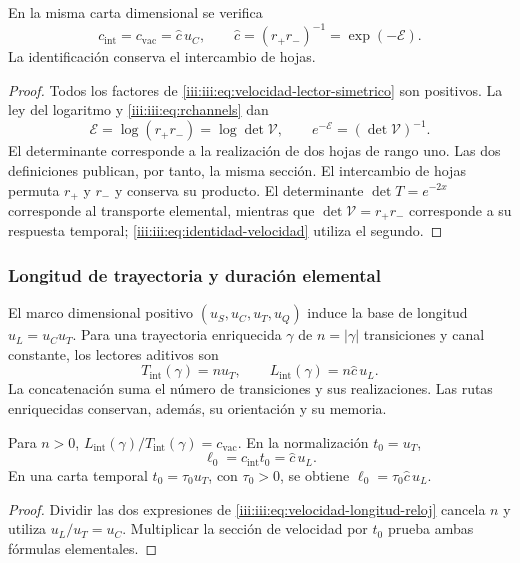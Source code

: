 \begin{proposition}
\label{iii:iii:prop:identidad-velocidad}
En la misma carta dimensional se verifica
\begin{equation}
 c_{\mathrm{int}}=c_{\mathrm{vac}}=\widehat c\,u_C,
 \qquad \widehat c=(r_+r_-)^{-1}=\exp(-\mathcal E).
 \label{iii:iii:eq:identidad-velocidad}
\end{equation}
La identificación conserva el intercambio de hojas.
\end{proposition}
\begin{proof}
Todos los factores de \eqref{iii:iii:eq:velocidad-lector-simetrico} son
positivos. La ley del logaritmo y \eqref{iii:iii:eq:rchannels} dan
\[
 \mathcal E=\log(r_+r_-)=\log\det\mathcal V,
 \qquad e^{-\mathcal E}=(\det\mathcal V)^{-1}.
\]
El determinante corresponde a la realización de dos hojas de rango uno.
Las dos definiciones publican, por tanto, la misma sección. El intercambio
de hojas permuta $r_+$ y $r_-$ y conserva su producto. El determinante
$\det T=e^{-2x}$ corresponde al transporte elemental, mientras que
$\det\mathcal V=r_+r_-$ corresponde a su respuesta temporal;
\eqref{iii:iii:eq:identidad-velocidad} utiliza el segundo.
\end{proof}

\subsubsection{Longitud de trayectoria y duración elemental}

El marco dimensional positivo $(u_S,u_C,u_T,u_Q)$ induce la base de
longitud $u_L=u_Cu_T$. Para una trayectoria enriquecida $\gamma$ de
$n=|\gamma|$ transiciones y canal constante, los lectores aditivos son
\begin{equation}
 T_{\mathrm{int}}(\gamma)=nu_T,
 \qquad L_{\mathrm{int}}(\gamma)=n\widehat c\,u_L.
 \label{iii:iii:eq:velocidad-longitud-reloj}
\end{equation}
La concatenación suma el número de transiciones y sus realizaciones.
Las rutas enriquecidas conservan, además, su orientación y su memoria.

\begin{corollary}
Para $n>0$, $L_{\mathrm{int}}(\gamma)/T_{\mathrm{int}}(\gamma)
=c_{\mathrm{vac}}$. En la normalización $t_0=u_T$,
\begin{equation}
 \ell_0=c_{\mathrm{int}}t_0=\widehat c\,u_L.
 \label{iii:iii:eq:longitud-elemental-constitutiva}
\end{equation}
En una carta temporal $t_0=\tau_0u_T$, con $\tau_0>0$, se obtiene
$\ell_0=\tau_0\widehat c\,u_L$.
\end{corollary}
\begin{proof}
Dividir las dos expresiones de \eqref{iii:iii:eq:velocidad-longitud-reloj}
cancela $n$ y utiliza $u_L/u_T=u_C$. Multiplicar la sección de velocidad
por $t_0$ prueba ambas fórmulas elementales.
\end{proof}

